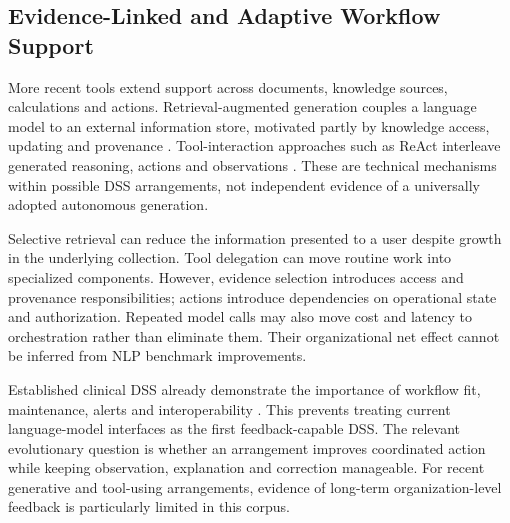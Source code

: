 \documentclass[journal]{IEEEtran}
\begin{document}
\subsection{Evidence-Linked and Adaptive Workflow Support}
More recent tools extend support across documents, knowledge sources, calculations and actions. Retrieval-augmented generation couples a language model to an external information store, motivated partly by knowledge access, updating and provenance \cite{Lewis2020}. Tool-interaction approaches such as ReAct interleave generated reasoning, actions and observations \cite{Yao2023}. These are technical mechanisms within possible DSS arrangements, not independent evidence of a universally adopted autonomous generation.

Selective retrieval can reduce the information presented to a user despite growth in the underlying collection. Tool delegation can move routine work into specialized components. However, evidence selection introduces access and provenance responsibilities; actions introduce dependencies on operational state and authorization. Repeated model calls may also move cost and latency to orchestration rather than eliminate them. Their organizational net effect cannot be inferred from NLP benchmark improvements.

Established clinical DSS already demonstrate the importance of workflow fit, maintenance, alerts and interoperability \cite{Sutton2020}. This prevents treating current language-model interfaces as the first feedback-capable DSS. The relevant evolutionary question is whether an arrangement improves coordinated action while keeping observation, explanation and correction manageable. For recent generative and tool-using arrangements, evidence of long-term organization-level feedback is particularly limited in this corpus.
\end{document}
